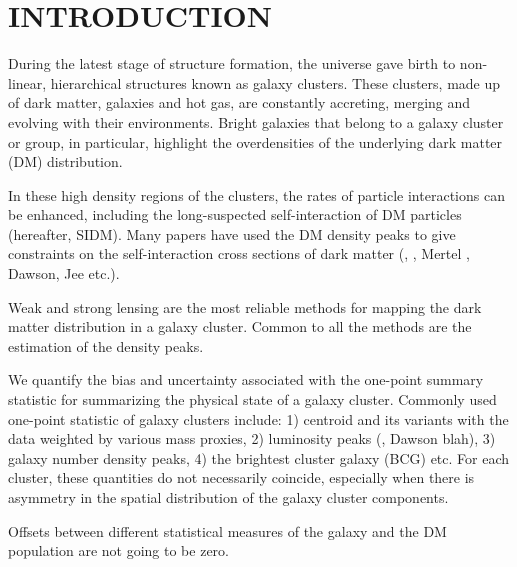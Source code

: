 
\section{INTRODUCTION} 
During the latest stage of structure formation, the universe gave birth to
non-linear, hierarchical structures known as galaxy clusters. 
These clusters, made up of dark matter, galaxies and hot gas,
are constantly accreting, merging and evolving with their
environments. Bright galaxies that belong to a galaxy cluster or group, in 
particular, highlight the overdensities of the underlying dark matter (DM) 
distribution. 


In these high density regions of the clusters, the rates of particle
interactions can be enhanced, including the long-suspected self-interaction of DM
particles (hereafter, SIDM). 
Many papers have used the DM density peaks to give constraints on 
the self-interaction cross
sections of dark matter (\citealt{Markevitch2004}, \citealt{Bradac2006b}, Mertel , Dawson, Jee etc.). 


Weak and strong lensing are the most reliable methods for mapping the dark 
matter distribution in a galaxy cluster. 
Common to all the methods are the estimation of the density peaks. 





We quantify the bias and uncertainty associated with the one-point summary
statistic for summarizing the physical state of a galaxy cluster. 
Commonly used one-point statistic of galaxy clusters include:
1) centroid and its variants with the data weighted by various mass proxies, 
2) luminosity peaks (\citep{Robertson2016}, Dawson blah), 
3) galaxy number density peaks,
4) the brightest cluster galaxy (BCG) etc.
For each cluster, these quantities do not necessarily coincide, 
especially when there is asymmetry in the spatial distribution of the galaxy 
cluster components. 

Offsets between different statistical measures of the galaxy and the DM
population are not going to be zero.

